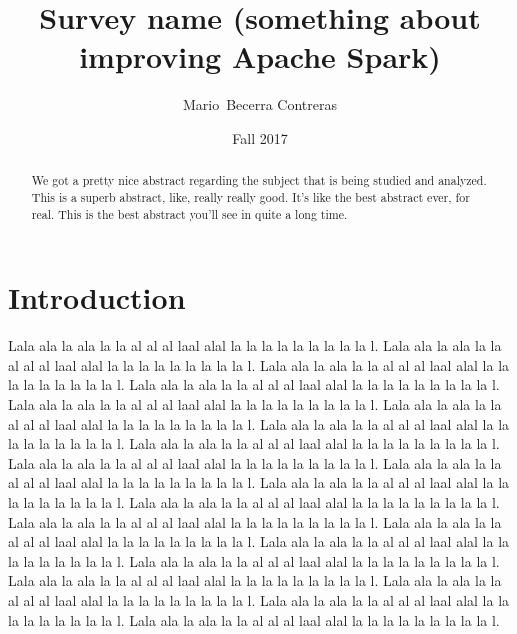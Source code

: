 \documentclass{article}
\begin{document}

\title{Survey name (something about improving Apache Spark)}

\author{Mario~Becerra Contreras}

\date{Fall 2017}


\maketitle

\begin{abstract}

We got a pretty nice abstract regarding the subject that is being studied and analyzed. This is a superb abstract, like, really really good. It's like the best abstract ever, for real. This is the best abstract you'll see in quite a long time.

\end{abstract}

\section{Introduction}

Lala ala la ala la la al al al laal alal la la la la la la la la la l. Lala ala la ala la la al al al laal alal la la la la la la la la la l. Lala ala la ala la la al al al laal alal la la la la la la la la la l. Lala ala la ala la la al al al laal alal la la la la la la la la la l. Lala ala la ala la la al al al laal alal la la la la la la la la la l. Lala ala la ala la la al al al laal alal la la la la la la la la la l. Lala ala la ala la la al al al laal alal la la la la la la la la la l. Lala ala la ala la la al al al laal alal la la la la la la la la la l. Lala ala la ala la la al al al laal alal la la la la la la la la la l. Lala ala la ala la la al al al laal alal la la la la la la la la la l. Lala ala la ala la la al al al laal alal la la la la la la la la la l. Lala ala la ala la la al al al laal alal la la la la la la la la la l. Lala ala la ala la la al al al laal alal la la la la la la la la la l. Lala ala la ala la la al al al laal alal la la la la la la la la la l. Lala ala la ala la la al al al laal alal la la la la la la la la la l. Lala ala la ala la la al al al laal alal la la la la la la la la la l. Lala ala la ala la la al al al laal alal la la la la la la la la la l. Lala ala la ala la la al al al laal alal la la la la la la la la la l. Lala ala la ala la la al al al laal alal la la la la la la la la la l. Lala ala la ala la la al al al laal alal la la la la la la la la la l. 
\end{document}
